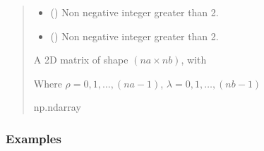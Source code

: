 \documentclass[a4paper,11pt,oneside,english,openany]{sphinxmanual}
\begin{document}
\begin{fulllineitems}
\label{\detokenize{psestimation:psestimation.calc_A}}
\pysigstartsignatures
{}
\pysigstopsignatures\begin{quote}\begin{description}
\begin{itemize}
\item {} 
\sphinxAtStartPar
{} () \textendash{} Non negative integer greater than 2.

\item {} 
\sphinxAtStartPar
{} () \textendash{} Non negative integer greater than 2.

\end{itemize}

\sphinxAtStartPar

\sphinxAtStartPar
{} \textendash{} A 2D matrix of shape \((na\times nb)\), with
\begin{center}
\end{center}
\sphinxAtStartPar
Where \(\rho = 0,1,\dots,(na-1)\), \(\lambda = 0,1,\dots,(nb-1)\)
\begin{center}
\end{center}

\sphinxAtStartPar
np.ndarray

\end{description}\end{quote}
\subsubsection*{Examples}


\end{fulllineitems}
\end{document}

